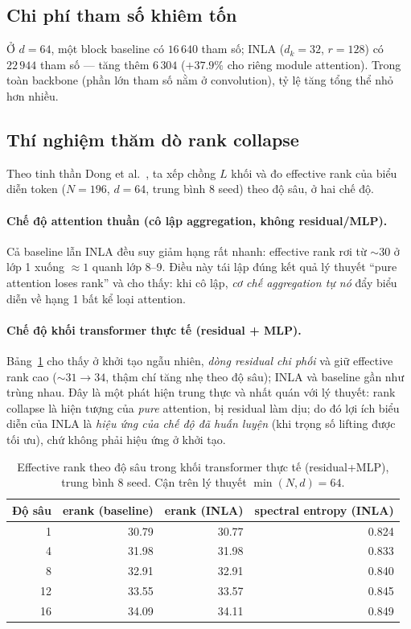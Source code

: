 \documentclass[12pt,a4paper]{article}
\begin{document}
\subsection{Chi phí tham số khiêm tốn}
Ở $d=64$, một block baseline có $16\,640$ tham số; INLA ($d_k=32$, $r=128$) có $22\,944$ tham số ---
tăng thêm $6\,304$ ($+37.9\%$ cho riêng module attention). Trong toàn backbone (phần lớn tham số nằm
ở convolution), tỷ lệ tăng tổng thể nhỏ hơn nhiều.

\subsection{Thí nghiệm thăm dò rank collapse}
Theo tinh thần Dong et al.\ \cite{dong2021rankcollapse}, ta xếp chồng $L$ khối và đo effective rank
của biểu diễn token ($N=196$, $d=64$, trung bình 8 seed) theo độ sâu, ở hai chế độ.

\paragraph{Chế độ attention thuần (cô lập aggregation, không residual/MLP).}
Cả baseline lẫn INLA đều suy giảm hạng rất nhanh: effective rank rơi từ $\sim 30$ ở lớp 1 xuống
$\approx 1$ quanh lớp 8--9. Điều này tái lập đúng kết quả lý thuyết ``pure attention loses rank'' và
cho thấy: khi cô lập, \emph{cơ chế aggregation tự nó} đẩy biểu diễn về hạng 1 bất kể loại attention.

\paragraph{Chế độ khối transformer thực tế (residual + MLP).}
Bảng~\ref{tab:rank} cho thấy ở khởi tạo ngẫu nhiên, \emph{dòng residual chi phối} và giữ effective
rank cao ($\sim 31\to 34$, thậm chí tăng nhẹ theo độ sâu); INLA và baseline gần như trùng nhau. Đây
là một phát hiện trung thực và nhất quán với lý thuyết: rank collapse là hiện tượng của \emph{pure}
attention, bị residual làm dịu; do đó lợi ích biểu diễn của INLA là \emph{hiệu ứng của chế độ đã
huấn luyện} (khi trọng số lifting được tối ưu), chứ không phải hiệu ứng ở khởi tạo.

\begin{table}[H]
\centering
\caption{Effective rank theo độ sâu trong khối transformer thực tế (residual+MLP), trung bình 8 seed.
Cận trên lý thuyết $\min(N,d)=64$.}
\label{tab:rank}
\begin{tabular}{@{}rrrr@{}}
\toprule
Độ sâu & erank (baseline) & erank (INLA) & spectral entropy (INLA) \\
\midrule
1  & 30.79 & 30.77 & 0.824 \\
4  & 31.98 & 31.98 & 0.833 \\
8  & 32.91 & 32.91 & 0.840 \\
12 & 33.55 & 33.57 & 0.845 \\
16 & 34.09 & 34.11 & 0.849 \\
\bottomrule
\end{tabular}
\end{table}
\end{document}
